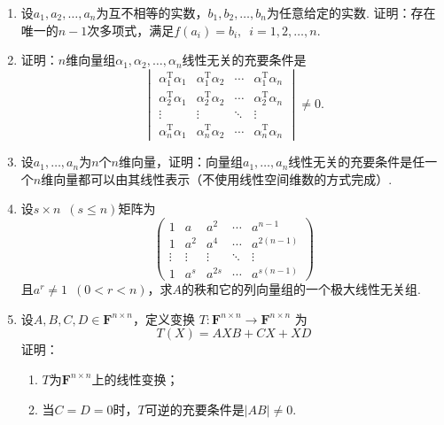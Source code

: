 \begin{enumerate}
    \item 设$a_1,a_2,\ldots,a_n$为互不相等的实数，$b_1,b_2,\ldots,b_n$为任意给定的实数. 证明：存在唯一的$n-1$次多项式，满足$f(a_i)=b_i,\enspace i=1,2,\ldots,n$.

    \item 证明：$n$维向量组$\alpha_1,\alpha_2,\ldots,\alpha_n$线性无关的充要条件是
          \[\begin{vmatrix}
                  \alpha_1^\mathrm{T}\alpha_1 & \alpha_1^\mathrm{T}\alpha_2 & \cdots & \alpha_1^\mathrm{T}\alpha_n \\
                  \alpha_2^\mathrm{T}\alpha_1 & \alpha_2^\mathrm{T}\alpha_2 & \cdots & \alpha_2^\mathrm{T}\alpha_n \\
                  \vdots                      & \vdots                      & \ddots & \vdots                      \\
                  \alpha_n^\mathrm{T}\alpha_1 & \alpha_n^\mathrm{T}\alpha_2 & \cdots & \alpha_n^\mathrm{T}\alpha_n
              \end{vmatrix}\neq 0.\]

    \item 设$a_1,\ldots,a_n$为$n$个$n$维向量，证明：向量组$a_1,\ldots,a_n$线性无关的充要条件是任一个$n$维向量都可以由其线性表示（不使用线性空间维数的方式完成）.

    \item 设$s \times n\enspace(s\leqslant n)$矩阵为
          \[\begin{pmatrix}
                  1      & a      & a^2    & \cdots & a^{n-1}    \\
                  1      & a^2    & a^4    & \cdots & a^{2(n-1)} \\
                  \vdots & \vdots & \vdots & \ddots & \vdots     \\
                  1      & a^s    & a^{2s} & \cdots & a^{s(n-1)}
              \end{pmatrix}\]
          且$a^r\neq 1\enspace(0<r<n)$，求$A$的秩和它的列向量组的一个极大线性无关组.

    \item 设$A,B,C,D \in \mathbf{F}^{n \times n}$，定义变换 $ T : \mathbf{F}^{n \times n} \to \mathbf{F}^{n \times n}$ 为
          \[ T(X) = AXB+CX+XD \]
          证明：
          \begin{enumerate}
              \item $T$为$\mathbf{F}^{n \times n}$上的线性变换；

              \item 当$C=D=0$时，$T$可逆的充要条件是$|AB| \neq 0$.
          \end{enumerate}


\end{enumerate}
